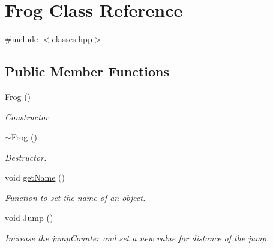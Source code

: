 \hypertarget{classFrog}{}\section{Frog Class Reference}
\label{classFrog}


{\ttfamily \#include $<$classes.\+hpp$>$}

\subsection*{Public Member Functions}
\begin{DoxyCompactItemize}
\item 
\hyperlink{classFrog_aca8f9a0c2bf409f2a0f876289881ede1}{Frog} ()
\begin{DoxyCompactList}\small\item\em Constructor. \end{DoxyCompactList}\item 
\hyperlink{classFrog_a03c9cd2a028e2466a3bfe5e9af1c12e7}{$\sim$\+Frog} ()
\begin{DoxyCompactList}\small\item\em Destructor. \end{DoxyCompactList}\item 
void \hyperlink{classFrog_aed2135d3c87ea38779a103904db1ac01}{get\+Name} ()
\begin{DoxyCompactList}\small\item\em Function to set the name of an object. \end{DoxyCompactList}\item 
void \hyperlink{classFrog_a7c7e8548354eb48bf7b7f9986e9b100c}{Jump} ()
\begin{DoxyCompactList}\small\item\em Increase the jump\+Counter and set a new value for distance of the jump. \end{DoxyCompactList}\end{DoxyCompactItemize}
